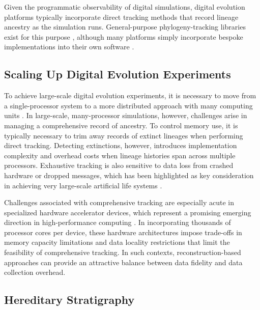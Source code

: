 Given the programmatic observability of digital simulations, digital evolution platforms typically incorporate direct tracking methods that record lineage ancestry as the simulation runs.
General-purpose phylogeny-tracking libraries exist for this purpose \citep{dolson2024phylotrack}, although many platforms simply incorporate bespoke implementations into their own software \citep{ofria2004avida}.

\subsection{Scaling Up Digital Evolution Experiments} \label{sec:introduction:distributed}

To achieve large-scale digital evolution experiments, it is necessary to move from a single-processor system to a more distributed approach with many computing units \citep{moreno2024trackable}.
In large-scale, many-processor simulations, however, challenges arise in managing a comprehensive record of ancestry.
To control memory use, it is typically necessary to trim away records of extinct lineages when performing direct tracking.
Detecting extinctions, however, introduces implementation complexity and overhead costs when lineage histories span across multiple processors.
Exhaustive tracking is also sensitive to data loss from crashed hardware or dropped messages, which has been highlighted as key consideration in achieving very large-scale artificial life systems \citep{ackley2016indefinite,ackley2014indefinitely}.

Challenges associated with comprehensive tracking are especially acute in specialized hardware accelerator devices, which represent a promising emerging direction in high-performance computing \citep{emani2024democratizing}.
In incorporating thousands of processor cores per device, these hardware architectures impose trade-offs in memory capacity limitations and data locality restrictions that limit the feasibility of comprehensive tracking.
In such contexts, reconstruction-based approaches can provide an attractive balance between data fidelity and data collection overhead.

\subsection{Hereditary Stratigraphy} \label{sec:introduction:hstrat}



